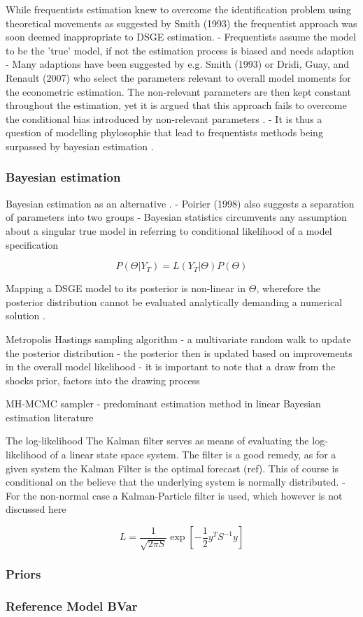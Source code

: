\documentclass[11pt,a4paper,english]{article} %
\begin{document}
	While frequentists estimation knew to overcome the identification problem using theoretical movements as suggested by Smith (1993) the frequentist approach was soon deemed inappropriate to DSGE estimation. 
	- Frequentists assume the model to be the 'true' model, if not the estimation process is biased and needs adaption
	- Many adaptions have been suggested by e.g. Smith (1993) or Dridi, Guay, and Renault (2007) who select the parameters relevant to overall model moments for the econometric estimation. The non-relevant parameters are then kept constant throughout the estimation, yet it is argued that this approach fails to overcome the conditional bias introduced by non-relevant parameters \cite{quintana_bayesian_nodate}.
	- It is thus a question of modelling phylosophie that lead to frequentists methods being surpassed by bayesian estimation \cite{quintana_bayesian_nodate}.
	
	
	\subsubsection{Bayesian estimation}
	
	Bayesian estimation as an alternative \cite{quintana_bayesian_nodate}.
	- Poirier (1998) also suggests a separation of parameters into two groups
	- Bayesian statistics circumvents any assumption about a singular true model in referring to conditional likelihood of a model specification
	
	\[
		P( \Theta | Y_{T}) = L(Y_{T} | \Theta) P(\Theta)
	\]
	
	Mapping a DSGE model to its posterior is non-linear in $\Theta$, wherefore the posterior distribution cannot be evaluated analytically demanding a numerical solution \cite{quintana_bayesian_nodate}.
	
	Metropolis Hastings sampling algorithm
	- a multivariate random walk to update the posterior distribution
	- the posterior then is updated based on improvements in the overall model likelihood
	- it is important to note that a draw from the shocks prior, factors into the drawing process
	
	MH-MCMC sampler
	- predominant estimation method in linear Bayesian estimation literature\cite{guerron-quintana_bayesian_2013}
	
	The log-likelihood
	The Kalman filter serves as means of evaluating the log-likelihood of a linear state space system. The filter is a good remedy, as for a given system the Kalman Filter is the optimal forecast (ref). This of course is conditional on the believe that the underlying system is normally distributed.
	- For the non-normal case a Kalman-Particle filter is used, which however is not discussed here
	
	\[
		L = \frac{1}{\sqrt{2 \pi S}} \exp [- \frac{1}{2} y^T S^{-1} y]
	\]
	
	\subsubsection{Priors}
	
	
	
	
	\subsubsection{Reference Model BVar}
	\cite{schorfheide_loss_2000}
	
	

	
	\pagebreak
	
\end{document}
